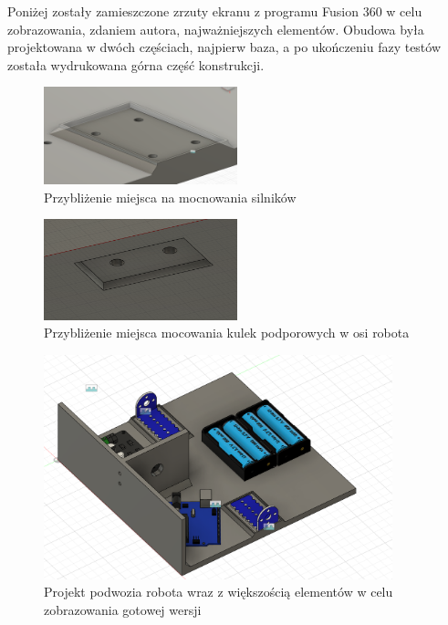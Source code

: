 Poniżej zostały zamieszczone zrzuty ekranu z programu Fusion 360 w celu zobrazowania, zdaniem autora, najważniejszych elementów. Obudowa była projektowana w dwóch częściach, najpierw baza, a po ukończeniu fazy testów została wydrukowana górna część konstrukcji. 

\begin{figure}[H]
  \centering
  \includegraphics[width=0.5\textwidth]{./graf/motor-close.png}
  \caption{Przybliżenie miejsca na mocnowania silników}
  \label{fig:base-close}
\end{figure}

\begin{figure}[H]
  \centering
  \includegraphics[width=0.5\textwidth]{./graf/ball-close.png}
  \caption{Przybliżenie miejsca mocowania kulek podporowych w osi robota}
  \label{fig:ball-close}
\end{figure}

\begin{figure}[H]
  \centering
  \includegraphics[width=0.9\textwidth]{./graf/base-full.png}
  \caption{Projekt podwozia robota wraz z większością elementów w celu zobrazowania gotowej wersji}
  \label{fig:base-full}
\end{figure}


